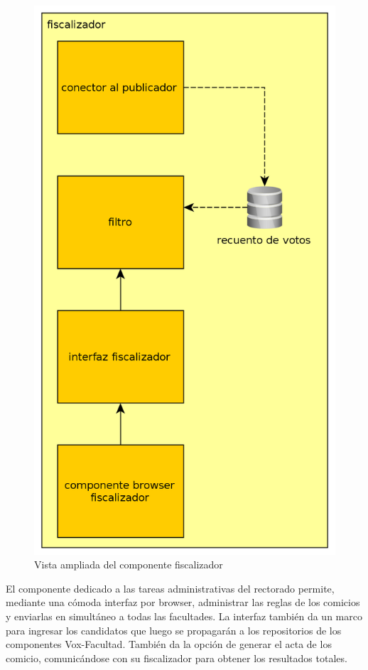 \begin{figure}[H]
	\begin{center}
		\includegraphics[scale=0.26]{../diagramas/fiscalizador.png}
		\caption{Vista ampliada del componente fiscalizador}
	\end{center} 
\end{figure} 

El componente dedicado a las tareas administrativas del rectorado permite, mediante una cómoda interfaz por browser, administrar las reglas de los comicios y enviarlas en simultáneo a todas las facultades. La interfaz también da un marco para ingresar los candidatos que luego se propagarán a los repositorios de los componentes Vox-Facultad. También da la opción de generar el acta de los comicio, comunicándose con su fiscalizador para obtener los resultados totales.



